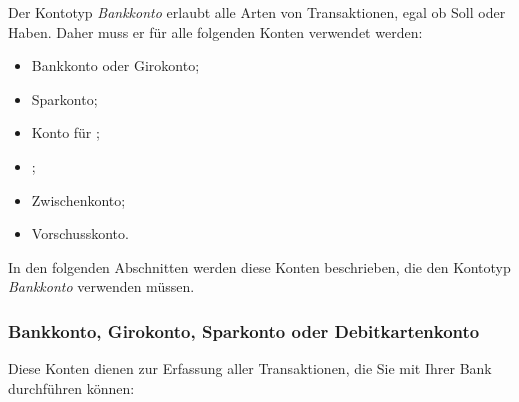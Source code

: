 Der Kontotyp \emph{Bankkonto} erlaubt alle Arten von Transaktionen, egal ob Soll oder Haben. Daher muss er für alle folgenden Konten verwendet werden:
\begin{itemize}
	\item Bankkonto oder Girokonto;
	\item Sparkonto;
	\item Konto für ;
	\item {};
	\item Zwischenkonto;
	\item Vorschusskonto.
\end{itemize}

In den folgenden Abschnitten werden diese Konten beschrieben, die den Kontotyp \emph{Bankkonto} verwenden müssen.


\subsubsection{Bankkonto, Girokonto, Sparkonto oder Debitkartenkonto\label{accounts-type-bank-misc}}

Diese Konten dienen zur Erfassung aller Transaktionen, die Sie mit Ihrer Bank durchführen können:

